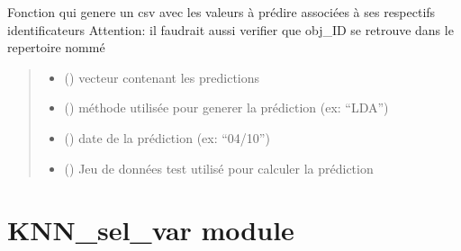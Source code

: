 \documentclass[letterpaper,10pt,french]{sphinxmanual}
\begin{document}
\begin{fulllineitems}
\label{\detokenize{general:general.submission}}
\pysigstartsignatures
{}
\pysigstopsignatures
\sphinxAtStartPar
Fonction qui genere un csv avec les valeurs à prédire associées à ses respectifs identificateurs
Attention: il faudrait aussi verifier que obj\_ID se retrouve dans le repertoire nommé
\begin{quote}\begin{description}
\begin{itemize}
\item {} 
\sphinxAtStartPar
{} () \textendash{} vecteur contenant les predictions

\item {} 
\sphinxAtStartPar
{} () \textendash{} méthode utilisée pour generer la prédiction (ex: “LDA”)

\item {} 
\sphinxAtStartPar
{} () \textendash{} date de la prédiction (ex: “04/10”)

\item {} 
\sphinxAtStartPar
{} () \textendash{} Jeu de données test utilisé pour calculer la prédiction

\end{itemize}

\end{description}\end{quote}

\end{fulllineitems}


\sphinxstepscope


\chapter{KNN\_sel\_var module}
\label{\detokenize{KNN_sel_var:module-KNN_sel_var}}\label{\detokenize{KNN_sel_var:knn-sel-var-module}}\label{\detokenize{KNN_sel_var::doc}}
\end{document}
